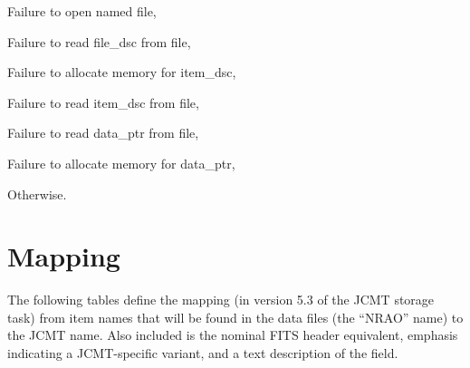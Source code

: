 \documentclass[oneside,11pt]{starlink}
\begin{document}
{{{{            \sstitem
             [1:] Failure to open named file,

            \sstitem
             [2:] Failure to read file\_dsc from file,

            \sstitem
             [3:] Failure to allocate memory for item\_dsc,

            \sstitem
             [4:] Failure to read item\_dsc from file,

            \sstitem
             [6:] Failure to read data\_ptr from file,

            \sstitem
             [7:] Failure to allocate memory for data\_ptr,

            \sstitem
             [0:] Otherwise.
         }
      }
   }
}

\clearpage
\section{Mapping}

The following tables define the mapping (in version 5.3 of the JCMT
storage task) from item names that will be found in the data files
(the ``NRAO'' name) to the JCMT name. Also included is the nominal
FITS header equivalent, emphasis indicating a JCMT-specific variant,
and a text description of the field.


\end{document}

